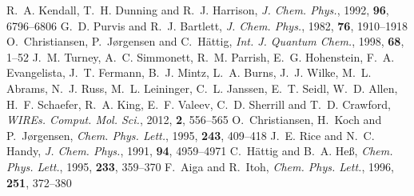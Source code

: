 \documentclass[11pt,article]{achemso}
\begin{document}
\begin{mcitethebibliography}{41}
\mciteSetBstMidEndSepPunct{\mcitedefaultmidpunct}
{\mcitedefaultendpunct}{\mcitedefaultseppunct}\relax
\EndOfBibitem
{}
R.~A. Kendall, T.~H. Dunning and R.~J. Harrison, \emph{J. Chem. Phys.}, 1992,
  \textbf{96}, 6796--6806\relax
\mciteBstWouldAddEndPuncttrue
\mciteSetBstMidEndSepPunct{\mcitedefaultmidpunct}
{\mcitedefaultendpunct}{\mcitedefaultseppunct}\relax
\EndOfBibitem
{}
G.~D. Purvis and R.~J. Bartlett, \emph{J. Chem. Phys.}, 1982, \textbf{76},
  1910--1918\relax
\mciteBstWouldAddEndPuncttrue
\mciteSetBstMidEndSepPunct{\mcitedefaultmidpunct}
{\mcitedefaultendpunct}{\mcitedefaultseppunct}\relax
\EndOfBibitem
{}
O.~Christiansen, P.~J{\o}rgensen and C.~H{\"a}ttig, \emph{Int. J. Quantum
  Chem.}, 1998, \textbf{68}, 1--52\relax
\mciteBstWouldAddEndPuncttrue
\mciteSetBstMidEndSepPunct{\mcitedefaultmidpunct}
{\mcitedefaultendpunct}{\mcitedefaultseppunct}\relax
\EndOfBibitem
{}
J.~M. Turney, A.~C. Simmonett, R.~M. Parrish, E.~G. Hohenstein, F.~A.
  Evangelista, J.~T. Fermann, B.~J. Mintz, L.~A. Burns, J.~J. Wilke, M.~L.
  Abrams, N.~J. Russ, M.~L. Leininger, C.~L. Janssen, E.~T. Seidl, W.~D. Allen,
  H.~F. Schaefer, R.~A. King, E.~F. Valeev, C.~D. Sherrill and T.~D. Crawford,
  \emph{WIREs. Comput. Mol. Sci.}, 2012, \textbf{2}, 556--565\relax
\mciteBstWouldAddEndPuncttrue
\mciteSetBstMidEndSepPunct{\mcitedefaultmidpunct}
{\mcitedefaultendpunct}{\mcitedefaultseppunct}\relax
\EndOfBibitem
{}
O.~Christiansen, H.~Koch and P.~J{\o}rgensen, \emph{Chem. Phys. Lett.}, 1995,
  \textbf{243}, 409--418\relax
\mciteBstWouldAddEndPuncttrue
\mciteSetBstMidEndSepPunct{\mcitedefaultmidpunct}
{\mcitedefaultendpunct}{\mcitedefaultseppunct}\relax
\EndOfBibitem
{}
J.~E. Rice and N.~C. Handy, \emph{J. Chem. Phys.}, 1991, \textbf{94},
  4959--4971\relax
\mciteBstWouldAddEndPuncttrue
\mciteSetBstMidEndSepPunct{\mcitedefaultmidpunct}
{\mcitedefaultendpunct}{\mcitedefaultseppunct}\relax
\EndOfBibitem
{}
C.~H{\"a}ttig and B.~A. He{\ss}, \emph{Chem. Phys. Lett.}, 1995, \textbf{233},
  359--370\relax
\mciteBstWouldAddEndPuncttrue
\mciteSetBstMidEndSepPunct{\mcitedefaultmidpunct}
{\mcitedefaultendpunct}{\mcitedefaultseppunct}\relax
\EndOfBibitem
{}
F.~Aiga and R.~Itoh, \emph{Chem. Phys. Lett.}, 1996, \textbf{251},
  372--380\relax
\mciteBstWouldAddEndPuncttrue
\mciteSetBstMidEndSepPunct{\mcitedefaultmidpunct}
{\mcitedefaultendpunct}{\mcitedefaultseppunct}\relax
\EndOfBibitem
\end{mcitethebibliography}


\end{document}
